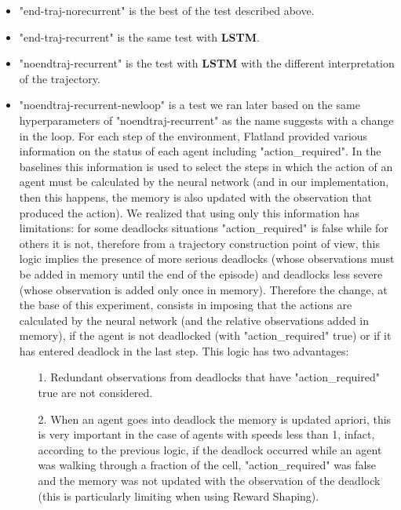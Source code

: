 \documentclass[11pt, a4paper, hidelinks]{report}
\begin{document}
\begin{itemize}
	\item "end-traj-norecurrent" is the best of the test described above.
	\item "end-traj-recurrent" is the same test with \textbf{LSTM}\@.
	\item "noendtraj-recurrent" is the test with \textbf{LSTM} with the different interpretation of the trajectory.
	\item "noendtraj-recurrent-newloop" is a test we ran later based on the same hyperparameters of "noendtraj-recurrent" as the name suggests with a change in the loop.
	For each step of the environment, Flatland provided various information on the status of each agent including "action\_required".
	In the baselines this information is used to select the steps in which the action of an agent must be calculated by the neural network (and in our implementation, then this happens, the memory is also updated with the observation that produced the action).
	We realized that using only this information has limitations: for some deadlocks situations "action\_required" is false while for others it is not, therefore from a trajectory construction point of view, this logic implies the presence of more serious deadlocks (whose observations must be added in memory until the end of the episode) and deadlocks less severe (whose observation is added only once in memory).
	Therefore the change, at the base of this experiment, consists in imposing that the actions are calculated by the neural network (and the relative observations added in memory), if the agent is not deadlocked (with "action\_required" true) or if it has entered deadlock in the last step.
	This logic has two advantages:
	\begin{enumerate}
		\item [1.] Redundant observations from deadlocks that have "action\_required" true are not considered.
		\item [2.] When an agent goes into deadlock the memory is updated apriori, this is very important in the case of agents with speeds less than 1, infact, according to the previous logic, if the deadlock occurred while an agent was walking through a fraction of the cell, "action\_required" was false and the memory was not updated with the observation of the deadlock (this is particularly limiting when using Reward Shaping).
	\end{enumerate}
\end{itemize}
\end{document}

